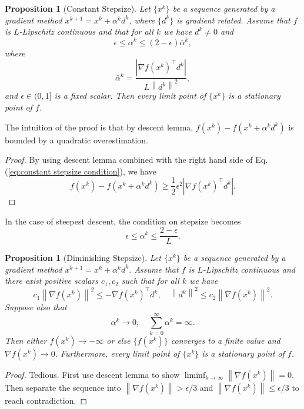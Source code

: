 \documentclass[12pt,a4paper]{article}
\numberwithin{equation}{section}
\theoremstyle{mystyle}
\newtheorem{proposition}[definition]{Proposition}
\newcommand{\grad}{\nabla}
\newcommand{\T}{\top}
\newcommand{\abs}[1]{\left\lvert #1 \right\rvert}
\newcommand{\norm}[1]{\left\lVert #1 \right\rVert}
\begin{document}
	\begin{proposition}[Constant Stepsize]
		Let $\{x^k\}$ be a sequence generated by a gradient method $x^{k+1}=x^k +\alpha^k d^k$, where $\{d^k\}$ is gradient related. Assume that $f$ is $L$-Lipschitz continuous and that for all $k$ we have $d^k\neq 0$ and 
		\begin{equation}
			\epsilon \leq \alpha^k\leq (2-\epsilon)\bar{\alpha}^k, \label{eq:constant stepsize condition}
		\end{equation}
		where
		$$
		\bar{\alpha}^k =\frac{\abs{\grad f(x^k)^\T d^k}}{L\norm{d^k}^2},
		$$
		and $\epsilon\in(0,1]$ is a fixed scalar. Then every limit point of $\{x^k\}$ is a stationary point of $f$.
	\end{proposition}
	The intuition of the proof is that by descent lemma, $f(x^k)-f(x^k +\alpha^k d^k)$ is bounded by a quadratic overestimation.
	\begin{proof}
		By using descent lemma combined with the right hand side of Eq. (\ref{eq:constant stepsize condition}), we have
		$$
		f(x^k)-f(x^k +\alpha^k d^k) \geq \frac{1}{2}\epsilon^2 \abs{\grad f(x^k)^\T d^k}.
		$$
	\end{proof}
	In the case of steepest descent, the condition on stepsize becomes
	$$
	\epsilon\leq \alpha^k \leq \frac{2-\epsilon}{L}.
	$$
	\begin{proposition}[Diminishing Stepsize]
		Let $\{x^k\}$ be a sequence generated by a gradient method $x^{k+1}=x^k +\alpha^k d^k$. Assume that $f$ is $L$-Lipschitz continuous and there exist positive scalars $c_1,c_2$ such that for all $k$ we have
		\begin{equation}
			c_1 \norm{\grad f(x^k)}^2 \leq -\grad f(x^k)^\T d^k,\quad \norm{d^k}^2 \leq c_2 \norm{\grad f(x^k)}^2.
		\end{equation}
		Suppose also that
		$$
		\alpha^k\to 0, \quad \sum_{k=0}^\infty \alpha^k =\infty.
		$$
		Then either $f(x^k)\to -\infty$ or else $\{f(x^k)\}$ converges to a finite value and $\grad f(x^k)\to 0$. Furthermore, every limit point of $\{x^k\}$ is a stationary point of $f$.
	\end{proposition}
	\begin{proof}
		Tedious. First use descent lemma to show $\liminf_{k\to\infty}\norm{\grad f(x^k)}=0$. Then separate the sequence into $\norm{\grad f(x^k)}>\epsilon/3$ and $\norm{\grad f(x^k)}\leq \epsilon/3$ to reach contradiction.
	\end{proof}
	
\end{document}
